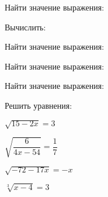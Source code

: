 \begin{listofex}
	\item Найти значение выражения:
	\begin{enumcols}[itemcolumns=3]
		\item {}
		\item {}
		\item {}
		\item {}
		\item {}
		\item {}
		\item {}
	\end{enumcols}
	\item Вычислить:
	\begin{enumcols}[itemcolumns=3]
		\item {}
		\item {}
		\item {}
	\end{enumcols}
	\item Найти значение выражения:
	\begin{enumcols}[itemcolumns=2]
		\item {}
		\item {}
		\item {}
	\end{enumcols}
	\item Найти значение выражения:
	\begin{enumcols}[itemcolumns=1]
		\item {}
		\item {}
	\end{enumcols}
	\item {}
	\item Найти значение выражения:
	\begin{enumcols}[itemcolumns=1]
		\item {}
		\item {}
	\end{enumcols}
	\item Решить уравнения:
	\begin{enumcols}[itemcolumns=2]
		\item \( \sqrt{15-2x}=3 \)
		\item \( \sqrt{\dfrac{6}{4x-54}}=\dfrac{1}{7} \)
		\item \( \sqrt{-72-17x}=-x \)
		\item \( \sqrt[3]{x-4}=3 \)
	\end{enumcols}
\end{listofex}
